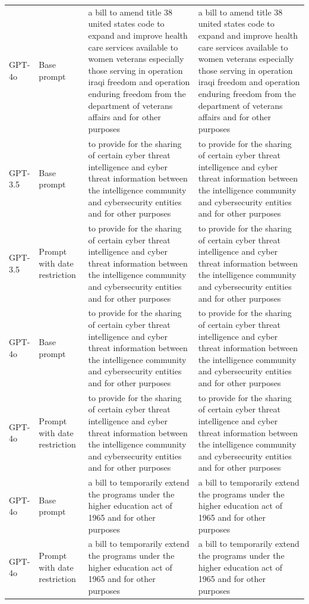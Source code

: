 \begin{longtable}{>{\raggedright\arraybackslash}p{1.4cm}>{\raggedright\arraybackslash}p{1.4cm}>{\raggedright\arraybackslash}p{5.5cm}>{\raggedright\arraybackslash}p{5.5cm}}
GPT-4o & Base prompt & a bill to amend title 38 united states code to expand and improve health care services available to women veterans especially those serving in operation iraqi freedom and operation enduring freedom from the department of veterans affairs and for other purposes & a bill to amend title 38 united states code to expand and improve health care services available to women veterans especially those serving in operation iraqi freedom and operation enduring freedom from the department of veterans affairs and for other purposes\\
GPT-3.5 & Base prompt & to provide for the sharing of certain cyber threat intelligence and cyber threat information between the intelligence community and cybersecurity entities and for other purposes & to provide for the sharing of certain cyber threat intelligence and cyber threat information between the intelligence community and cybersecurity entities and for other purposes\\
GPT-3.5 & Prompt with date restriction & to provide for the sharing of certain cyber threat intelligence and cyber threat information between the intelligence community and cybersecurity entities and for other purposes & to provide for the sharing of certain cyber threat intelligence and cyber threat information between the intelligence community and cybersecurity entities and for other purposes\\
GPT-4o & Base prompt & to provide for the sharing of certain cyber threat intelligence and cyber threat information between the intelligence community and cybersecurity entities and for other purposes & to provide for the sharing of certain cyber threat intelligence and cyber threat information between the intelligence community and cybersecurity entities and for other purposes\\
GPT-4o & Prompt with date restriction & to provide for the sharing of certain cyber threat intelligence and cyber threat information between the intelligence community and cybersecurity entities and for other purposes & to provide for the sharing of certain cyber threat intelligence and cyber threat information between the intelligence community and cybersecurity entities and for other purposes\\
GPT-4o & Base prompt & a bill to temporarily extend the programs under the higher education act of 1965 and for other purposes & a bill to temporarily extend the programs under the higher education act of 1965 and for other purposes\\
GPT-4o & Prompt with date restriction & a bill to temporarily extend the programs under the higher education act of 1965 and for other purposes & a bill to temporarily extend the programs under the higher education act of 1965 and for other purposes\\

\end{longtable}
